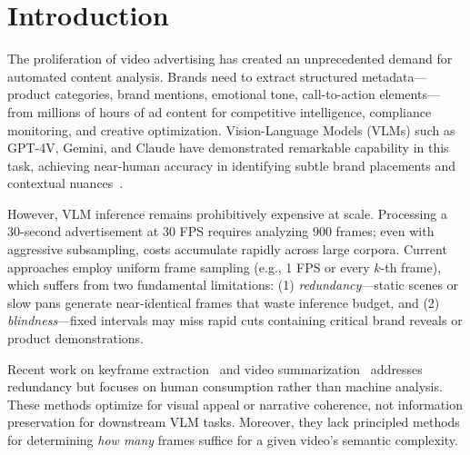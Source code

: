 \documentclass[sigconf,nonacm]{acmart}
\begin{document}


\maketitle

\section{Introduction}
\label{sec:introduction}

The proliferation of video advertising has created an unprecedented demand for automated content analysis. Brands need to extract structured metadata---product categories, brand mentions, emotional tone, call-to-action elements---from millions of hours of ad content for competitive intelligence, compliance monitoring, and creative optimization. Vision-Language Models (VLMs) such as GPT-4V, Gemini, and Claude have demonstrated remarkable capability in this task, achieving near-human accuracy in identifying subtle brand placements and contextual nuances~\cite{liu2023visual, team2023gemini}.

However, VLM inference remains prohibitively expensive at scale. Processing a 30-second advertisement at 30 FPS requires analyzing 900 frames; even with aggressive subsampling, costs accumulate rapidly across large corpora. Current approaches employ uniform frame sampling (e.g., 1 FPS or every $k$-th frame), which suffers from two fundamental limitations: (1) \textit{redundancy}---static scenes or slow pans generate near-identical frames that waste inference budget, and (2) \textit{blindness}---fixed intervals may miss rapid cuts containing critical brand reveals or product demonstrations.

Recent work on keyframe extraction~\cite{potapov2014category, singh2022temporal} and video summarization~\cite{zhou2018deep, zhao2021video} addresses redundancy but focuses on human consumption rather than machine analysis. These methods optimize for visual appeal or narrative coherence, not information preservation for downstream VLM tasks. Moreover, they lack principled methods for determining \textit{how many} frames suffice for a given video's semantic complexity.
\end{document}
